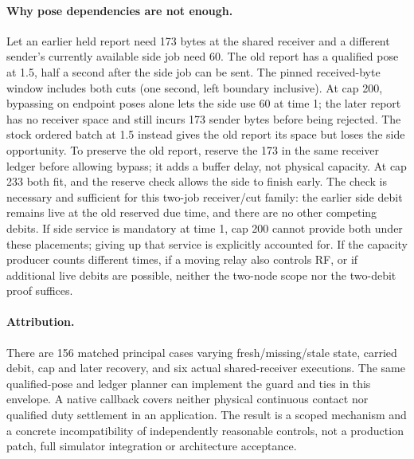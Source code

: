 \documentclass[11pt]{article}
\begin{document}
\paragraph{Why pose dependencies are not enough.}
Let an earlier held report need 173 bytes at the shared receiver
and a different sender's currently available side job need 60.
The old report has a qualified pose at 1.5, half a second after
the side job can be sent. The pinned received-byte window includes
both cuts (one second, left boundary inclusive). At cap 200,
bypassing on endpoint poses alone lets the side use 60 at time 1;
the later report has no receiver space and still incurs 173
sender bytes before being rejected. The stock ordered batch at
1.5 instead gives the old report its space but loses the side
opportunity. To preserve the old report, reserve the 173 in the
same receiver ledger before allowing bypass; it adds a buffer
delay, not physical capacity. At cap 233 both fit, and the
reserve check allows the side to finish early. The check is
necessary and sufficient for this two-job receiver/cut family:
the earlier side debit remains live at the old reserved due
time, and there are no other competing debits. If side service
is mandatory at time 1, cap 200 cannot provide both under
these placements; giving up that service is explicitly accounted
for. If the capacity producer counts different times, if a moving
relay also controls RF, or if additional live debits are possible,
neither the two-node scope nor the two-debit proof suffices.

\paragraph{Attribution.}
There are 156 matched principal cases varying fresh/missing/stale
state, carried debit, cap and later recovery, and six actual
shared-receiver executions. The same qualified-pose and ledger
planner can implement the guard and ties in this envelope.
A native callback covers neither physical continuous contact
nor qualified duty settlement in an application. The result is a
scoped mechanism and a concrete incompatibility of independently
reasonable controls, not a production patch, full simulator
integration or architecture acceptance.
\end{document}
